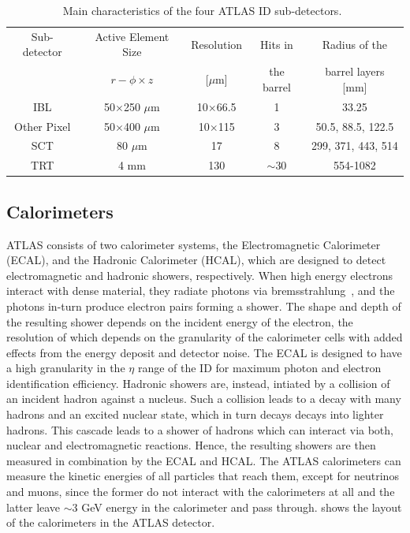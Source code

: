 \begin{table}[!ht]
    \centering
    \begin{tabular}{ccccc}
        \hline \hline
        Sub-detector & Active Element Size & Resolution & Hits in & Radius of the \\
         & $r-\phi \times z$ & [$\mu$m] & the barrel & barrel layers [mm] \\
         \hline
        IBL   & 50$\times$250 $\mu$m & 10$\times$66.5  & 1   & 33.25 \\
        Other Pixel & 50$\times$400 $\mu$m & 10$\times$115 & 3   & 50.5, 88.5, 122.5 \\
        SCT   & 80 $\mu$m          & 17            & 8   & 299, 371, 443, 514 \\
        TRT   & 4 mm               & 130           & $\sim$30 & 554-1082 \\
        \hline \hline
    \end{tabular}
    \caption{Main characteristics of the four ATLAS ID sub-detectors.~\cite{ATLAS-CONF-2014-047, ATL-INDET-PUB-2016-001}}
    \label{tab:id_chars}
\end{table}

\subsection{Calorimeters}
ATLAS consists of two calorimeter systems, the Electromagnetic Calorimeter (ECAL), and the Hadronic Calorimeter (HCAL), which are designed to detect electromagnetic and hadronic showers, respectively. When high energy electrons interact with dense material, they radiate photons via bremsstrahlung~\cite{Workman:2022ynf}, and the photons in-turn produce electron pairs forming a shower. The shape and depth of the resulting shower depends on the incident energy of the electron, the resolution of which depends on the granularity of the calorimeter cells with added effects from the energy deposit and detector noise. The ECAL is designed to have a high granularity in the $\eta$ range of the ID for maximum photon and electron identification efficiency. Hadronic showers are, instead, intiated by a collision of an incident hadron against a nucleus. Such a collision leads to a decay with many hadrons and an excited nuclear state, which in turn decays decays into lighter hadrons. This cascade leads to a shower of hadrons which can interact via both, nuclear and electromagnetic reactions. Hence, the resulting showers are then measured in combination by the ECAL and HCAL. The ATLAS calorimeters can measure the kinetic energies of all particles that reach them, except for neutrinos and muons, since the former do not interact with the calorimeters at all and the latter leave $\sim$3 GeV energy in the calorimeter and pass through.  shows the layout of the calorimeters in the ATLAS detector. 

